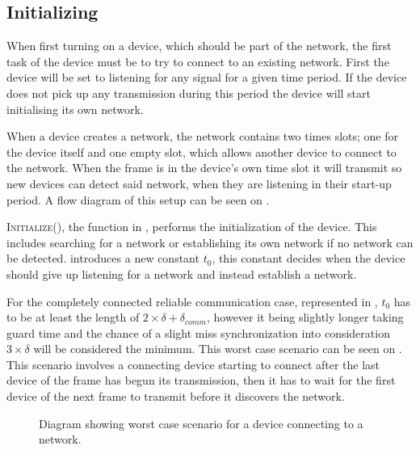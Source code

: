 \subsection{Initializing} %
\label{sub:setupCCRC} 
When first turning on a device, which should be part of the network, the first task of the device must be to try to connect to an existing network.
First the device will be set to listening for any signal for a given time period. 
If the device does not pick up any transmission during this period the device will start initialising its own network.

When a device creates a network, the network contains two times slots; one for the device itself and one empty slot, which allows another device to connect to the network.
When the frame is in the device's own time slot it will transmit so new devices can detect said network, when they are listening in their start-up period.  
A flow diagram of this setup can be seen on .

 
\noindent
\textsc{Initialize()}, the function in , performs the initialization of the device.
This includes searching for a network or establishing its own network if no network can be detected.
 introduces a new constant $t_0$, this constant decides when the device should give up listening for a network and instead establish a network.

For the completely connected reliable communication case, represented in , $t_0$ has to be at least the length of $2 \times \delta + \delta_{comm}$, however it being slightly longer taking guard time and the chance of a slight miss synchronization into consideration $3 \times \delta$ will be considered the minimum. 
This worst case scenario can be seen on .
This scenario involves a connecting device starting to connect after the last device of the frame has begun its transmission, then it has to wait for the first device of the next frame to transmit before it discovers the network. 

\begin{figure}[p]                                  
\centering
\footnotesize

\caption{Diagram showing worst case scenario for a device connecting to a network.}
\label{fig:worsttimeccrc}    
\end{figure}

